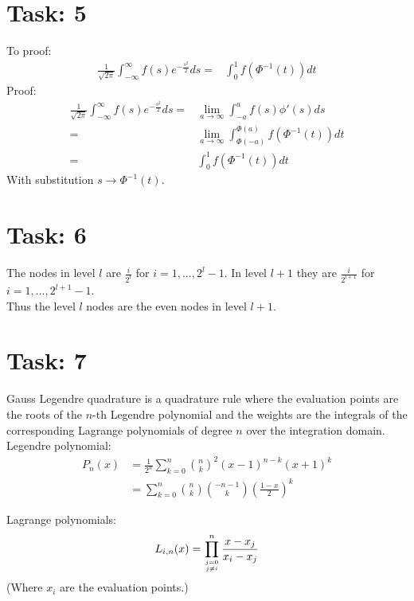 \documentclass{article}
\begin{document}
\section*{Task: 5}

\noindent To proof:
\begin{align*}
 \frac{1}{\sqrt{2 \pi}} \int_{-\infty}^\infty f(s)e^{-\frac{s^2}{2}}ds =& \int_{0}^1 f(\Phi^{-1}(t))dt
\end{align*}
Proof:
\begin{align*}
 \frac{1}{\sqrt{2 \pi}} \int_{-\infty}^\infty f(s)e^{-\frac{s^2}{2}}ds =& \lim_{a\rightarrow \infty}\int_{-a}^a f(s) \phi '(s)ds\\
  =& \lim_{a\rightarrow \infty}\int_{\Phi(-a)}^{\Phi(a)} f(\Phi^{-1}(t)) dt\\
  =& \int_{0}^{1} f(\Phi^{-1}(t)) dt
\end{align*}
With substitution $s\rightarrow \Phi^{-1}(t)$.
{\flushright{$\qed$}}

\section*{Task: 6}

The nodes in level $l$ are $\frac{i}{2^l}$ for $i=1,...,2^l-1$.
In level $l + 1$ they are $\frac{i}{2^{l+1}}$ for $i=1,...,2^{l+1}-1$.\\
Thus the level $l$ nodes are the even nodes in level $l+1$.

\section*{Task: 7}

\noindent Gauss Legendre quadrature is a quadrature rule where the evaluation points are the roots of the
$n$-th Legendre polynomial and the weights are the integrals of the corresponding Lagrange polynomials of degree $n$ over the integration domain.\\

\noindent Legendre polynomial:
\begin{align*}
 P_n(x)&=\frac{1}{2^n}\sum_{k=0}^n {n \choose k}^2 (x-1)^{n-k}(x+1)^k \\
 &= \sum_{k=0}^n {n \choose k}{-n-1 \choose k}\left(\frac{1-x}{2}\right)^k
\end{align*}

\noindent Lagrange polynomials:
\begin{align*}
 L_{i,n}(x)=\prod_{j=0 \atop j\neq i}^n \frac{x-x_j}{x_i-x_j}
\end{align*}
(Where $x_i$ are the evaluation points.)
\end{document}
